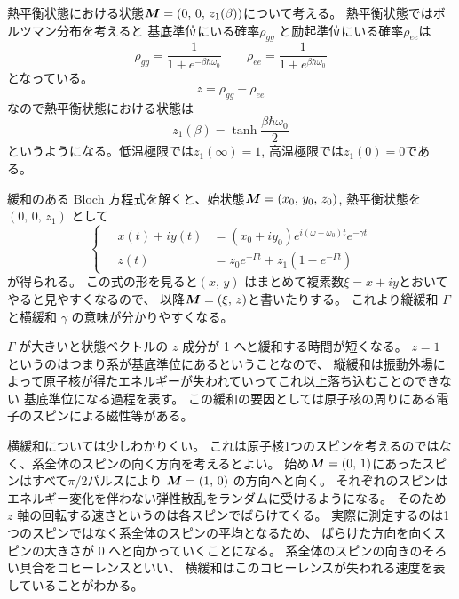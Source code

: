 \documentclass[11pt,dvipdfmx,a4paper]{jsarticle}
\begin{document}
熱平衡状態における状態\(\vb*{M}=(0,\,0,\,z_{1}(\beta))\)について考える。
熱平衡状態ではボルツマン分布を考えると
基底準位にいる確率\(\rho_{gg}\) と励起準位にいる確率\(\rho_{ee}\)は
\begin{equation}
	\rho_{gg} = \frac{1}{1 + e^{-\beta \hbar\omega_0}} \qquad
	\rho_{ee} = \frac{1}{1 + e^{\beta \hbar\omega_0}}
\end{equation}
となっている。
\begin{equation}
	z = \rho_{gg} - \rho_{ee}
\end{equation}
なので熱平衡状態における状態は
\begin{equation}
	z_{1}(\beta) = \tanh{\frac{\beta\hbar\omega_0}{2}}
\end{equation}
というようになる。低温極限では\(z_{1}(\infty)=1\), 高温極限では\(z_{1}(0) = 0\)である。

緩和のある Bloch 方程式を解くと、始状態\(\vb*{M}=\qty(x_0,\,y_0,\,z_0)\), 熱平衡状態を\((0,\,0,\,z_{1})\)
として
\begin{equation}
	\left\{\quad
	\begin{aligned}
		x(t) + iy(t) &= (x_0 + iy_0) e^{i(\omega-\omega_0)t}e^{-\gamma t}\\
		z(t) &= z_0 e^{-\Gamma t} + z_{1}(1-e^{-\Gamma t})
	\end{aligned}\right. \label{eq:relaxed_Bloch_sol}
\end{equation}
が得られる。
この式の形を見ると\((x,\,y)\) はまとめて複素数\(\xi = x + iy\)とおいてやると見やすくなるので、
以降\(\vb*{M}=(\xi,\,z)\)と書いたりする。
これより縦緩和 \(\Gamma\) と横緩和 \(\gamma\) の意味が分かりやすくなる。

\(\Gamma\) が大きいと状態ベクトルの \(z\) 成分が 1 へと緩和する時間が短くなる。
\(z=1\) というのはつまり系が基底準位にあるということなので、
縦緩和は振動外場によって原子核が得たエネルギーが失われていってこれ以上落ち込むことのできない
基底準位になる過程を表す。
この緩和の要因としては原子核の周りにある電子のスピンによる磁性等がある。%

横緩和については少しわかりくい。
これは原子核1つのスピンを考えるのではなく、系全体のスピンの向く方向を考えるとよい。
始め\(\vb*{M}=(0,\,1)\)にあったスピンはすべて\(\pi/2\)パルスにより
\(\vb*{M}=(1,\,0)\) の方向へと向く。
それぞれのスピンはエネルギー変化を伴わない弾性散乱をランダムに受けるようになる。
そのため \(z\) 軸の回転する速さというのは各スピンでばらけてくる。
実際に測定するのは1つのスピンではなく系全体のスピンの平均となるため、
ばらけた方向を向くスピンの大きさが 0 へと向かっていくことになる。
系全体のスピンの向きのそろい具合をコヒーレンスといい、
横緩和はこのコヒーレンスが失われる速度を表していることがわかる。
\end{document}
